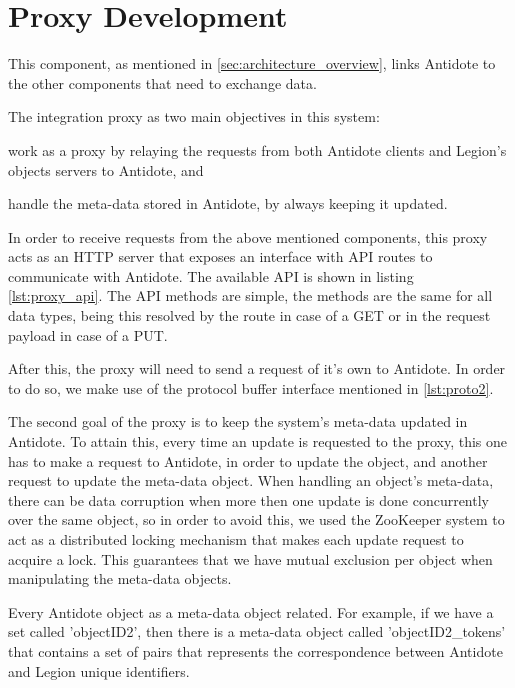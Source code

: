 \section{Proxy Development}
\label{sec:proxy_development}
This component, as mentioned in \ref{sec:architecture_overview}, links Antidote to the other components that need to exchange data.\par
	The integration proxy as two main objectives in this system: 
\begin{enumerate*}[(i)]
\item work as a proxy by relaying the requests from both Antidote clients and Legion's objects servers to Antidote, and 
\item handle the meta-data stored in Antidote, by always keeping it updated.
\end{enumerate*}
\par
	In order to receive requests from the above mentioned components, this proxy acts as an HTTP server that exposes an interface with API routes to communicate with Antidote. The available API is shown in listing \ref{lst:proxy_api}. The API methods are simple, the methods are the same for all data types, being this resolved by the route in case of a GET or in the request payload in case of a PUT.\par
	After this, the proxy will need to send a request of it's own to Antidote. In order to do so, we make use of the protocol buffer interface mentioned in \ref{lst:proto2}.\par
	The second goal of the proxy is to keep the system's meta-data updated in Antidote. To attain this, every time an update is requested to the proxy, this one has to make a request to Antidote, in order to update the object, and another request to update the meta-data object. When handling an object's meta-data, there can be data corruption when more then one update is done concurrently over the same object, so in order to avoid this, we used the ZooKeeper system to act as a distributed locking mechanism that makes each update request to acquire a lock. This guarantees that we have mutual exclusion per object when manipulating the meta-data objects.\par
	Every Antidote object as a meta-data object related. For example, if we have a set called 'objectID2', then there is a meta-data object called 'objectID2\_tokens' that contains a set of pairs that represents the correspondence between Antidote and Legion unique identifiers.
	
